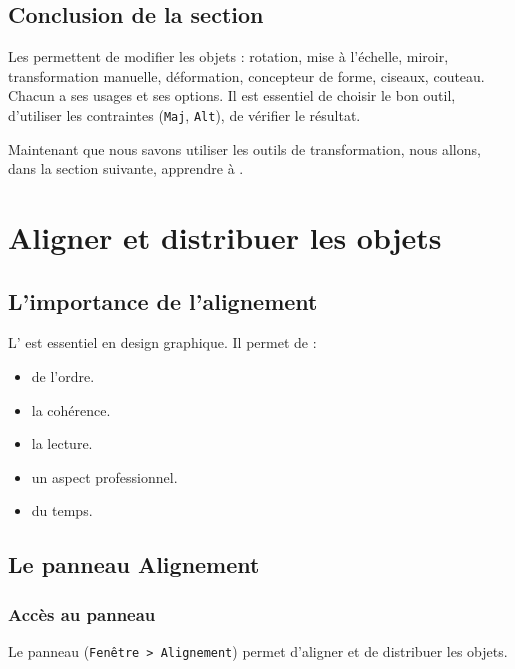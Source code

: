 \subsection*{Conclusion de la section}

Les  permettent de modifier les objets : rotation, mise à l'échelle, miroir, transformation manuelle, déformation, concepteur de forme, ciseaux, couteau. Chacun a ses usages et ses options. Il est essentiel de choisir le bon outil, d'utiliser les contraintes (\texttt{Maj}, \texttt{Alt}), de vérifier le résultat.

Maintenant que nous savons utiliser les outils de transformation, nous allons, dans la section suivante, apprendre à .

\section{Aligner et distribuer les objets}

\subsection{L'importance de l'alignement}

L' est essentiel en design graphique. Il permet de :

\begin{itemize}
    \item {} de l'ordre.
    \item {} la cohérence.
    \item {} la lecture.
    \item {} un aspect professionnel.
    \item {} du temps.
\end{itemize}

\subsection{Le panneau Alignement}

\subsubsection{Accès au panneau}

Le panneau  (\texttt{Fenêtre > Alignement}) permet d'aligner et de distribuer les objets.

